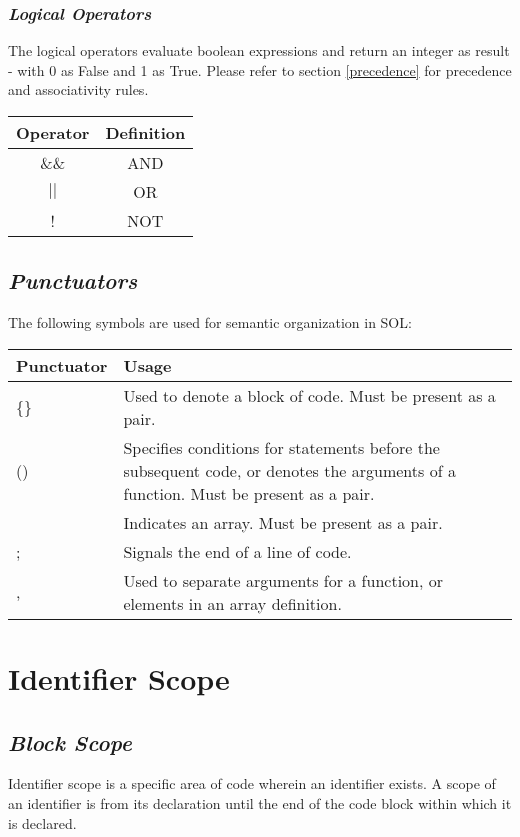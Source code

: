 \documentclass[letterpaper,12pt]{article}
\begin{document}
        \subsubsection{\textit{Logical Operators}}
        The logical operators evaluate boolean expressions and return an integer as result - with 0 as False and 1 as True. Please refer to section \ref{precedence} for precedence and associativity rules.
        \begin{center}
        	\begin{tabular}{ |c|c| }
        		\hline
        		\textbf{Operator} & \textbf{Definition}\\
        		\hline
        		\&\&  & AND\\
        		$||$  & OR\\
        		!  & NOT\\
        		\hline
        	\end{tabular}
        \end{center}

	\subsection{\textit{Punctuators}}
	The following symbols are used for semantic organization in SOL:
     \begin{center}
     	\begin{tabular}{ |p{0.25\hsize}|p{0.75\hsize}| }
     		\hline
     		\textbf{Punctuator} & \textbf{Usage} \\
     		\hline
     		\{\}			& Used to denote a block of code. Must be present as a pair. \\
     		()				& Specifies conditions for statements before the subsequent code, or denotes the arguments of a function. Must be present as a pair. \\
     		\lbrack\rbrack	& Indicates an array. Must be present as a pair. \\
     		;				& Signals the end of a line of code. \\
     		,				& Used to separate arguments for a function, or elements in an array definition. \\
     		\hline
     	\end{tabular}
     \end{center}
	
\section{Identifier Scope}
	\subsection{\textit{Block Scope}}
	Identifier scope is a specific area of code wherein an identifier exists. A scope of an identifier is from its declaration until the end of the code block within which it is declared.
	
\end{document}
